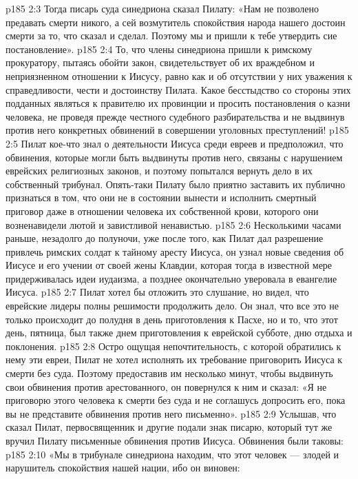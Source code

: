 \vs p185 2:3 Тогда писарь суда синедриона сказал Пилату: «Нам не позволено предавать смерти никого, а сей возмутитель спокойствия народа нашего достоин смерти за то, что сказал и сделал. Поэтому мы и пришли к тебе утвердить сие постановление».
\vs p185 2:4 То, что члены синедриона пришли к римскому прокуратору, пытаясь обойти закон, свидетельствует об их враждебном и неприязненном отношении к Иисусу, равно как и об отсутствии у них уважения к справедливости, чести и достоинству Пилата. Какое бесстыдство со стороны этих подданных являться к правителю их провинции и просить постановления о казни человека, не проведя прежде честного судебного разбирательства и не выдвинув против него конкретных обвинений в совершении уголовных преступлений!
\vs p185 2:5 Пилат кое\hyp{}что знал о деятельности Иисуса среди евреев и предположил, что обвинения, которые могли быть выдвинуты против него, связаны с нарушением еврейских религиозных законов, и поэтому попытался вернуть дело в их собственный трибунал. Опять\hyp{}таки Пилату было приятно заставить их публично признаться в том, что они не в состоянии вынести и исполнить смертный приговор даже в отношении человека их собственной крови, которого они возненавидели лютой и завистливой ненавистью.
\vs p185 2:6 \pc Несколькими часами раньше, незадолго до полуночи, уже после того, как Пилат дал разрешение привлечь римских солдат к тайному аресту Иисуса, он узнал новые сведения об Иисусе и его учении от своей жены Клавдии, которая тогда в известной мере придерживалась идеи иудаизма, а позднее окончательно уверовала в евангелие Иисуса.
\vs p185 2:7 \pc Пилат хотел бы отложить это слушание, но видел, что еврейские лидеры полны решимости продолжить дело. Он знал, что все это не только происходит до полудня в день приготовления к Пасхе, но и то, что этот день, пятница, был также днем приготовления к еврейской субботе, дню отдыха и поклонения.
\vs p185 2:8 Остро ощущая непочтительность, с которой обратились к нему эти евреи, Пилат не хотел исполнять их требование приговорить Иисуса к смерти без суда. Поэтому предоставив им несколько минут, чтобы выдвинуть свои обвинения против арестованного, он повернулся к ним и сказал: «Я не приговорю этого человека к смерти без суда и не соглашусь допросить его, пока вы не представите обвинения против него письменно».
\vs p185 2:9 Услышав, что сказал Пилат, первосвященник и другие подали знак писарю, который тут же вручил Пилату письменные обвинения против Иисуса. Обвинения были таковы:
\vs p185 2:10 \pc «Мы в трибунале синедриона находим, что этот человек --- злодей и нарушитель спокойствия нашей нации, ибо он виновен:
